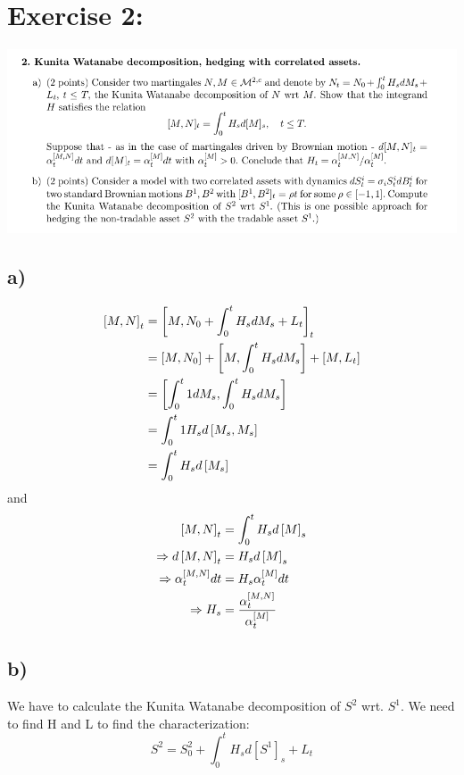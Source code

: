 \documentclass[document.tex]{subfiles}
\begin{document}
\section*{Exercise 2:}


\includegraphics[width=\textwidth]{ex2.png}
\subsection*{a)}
\begin{align*}
	\left[M , N \right]_t &= \left[M , N_0 + \int_0^t H_s dM_s + L_t \right]_t\\
	&= \left[M , N_0 \right] + \left[M , \int_0^t H_s dM_s \right] + \left[M , L_t \right]\\
	&= \left[\int_0^t 1 dM_s , \int_0^t H_s dM_s \right]\\
	&= \int_0^t 1 H_s d \left[M_s , M_s \right]\\
	&= \int_0^t H_s d \left[ M_s \right]
\end{align*}
and \\
\begin{align*}
	\left[M , N \right]_t &= \int_0^t H_s d \left[ M \right]_s \\
	\Rightarrow	d \left[M , N \right]_t &= H_s d \left[ M \right]_s \\
	\Rightarrow	\alpha_t^{\left[M , N \right]} dt &= H_s \alpha_t^{\left[ M \right]} dt \\
	\Rightarrow H_s &= \frac{\alpha_t^{\left[M , N \right]}}{\alpha_t^{\left[ M \right]}}
\end{align*}

\subsection*{b)} 
We have to calculate the Kunita Watanabe decomposition of $S^2$ wrt. $S^1$. We need to find H and L to find the characterization:
\begin{equation}
S^2 = S_0^2 + \int_0^t H_s d[S^1]_s + L_t
\end{equation}

\end{document}
